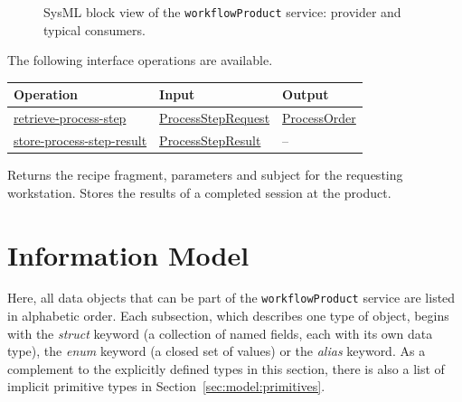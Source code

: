 \documentclass[a4paper]{arrowhead}
\newcommand{\mref}[1]{{\textcolor{ArrowheadPurple}{\hyperref[sec:model:#1]{#1}}}}
\newcommand{\oref}[1]{{\textcolor{ArrowheadBlue}{\hyperref[sec:operations:#1]{#1}}}}
\begin{document}
\begin{figure}[ht!]
  \centering
  \caption{SysML block view of the \texttt{workflowProduct} service: provider and typical consumers.}
  \label{fig:SD}
\end{figure}

The following interface operations are available.

{\small
\begin{longtable}{|p{4.4cm}|p{5.6cm}|p{5.8cm}|}

\hline
\rowcolor{gray!33} Operation & Input & Output \\ \hline
\endhead
\oref{retrieve-process-step} & \mref{ProcessStepRequest} & \mref{ProcessOrder} \\ \hline
\oref{store-process-step-result} & \mref{ProcessStepResult} & -- \\ \hline
\end{longtable}
}

Returns the recipe fragment, parameters and subject for the requesting workstation.
Stores the results of a completed session at the product.

\newpage
\section{Information Model}
\label{sec:model}
Here, all data objects that can be part of the \texttt{workflow\allowbreak{}Product} service are listed in alphabetic order. Each
subsection, which describes one type of object, begins with the \textit{struct} keyword (a collection of named fields,
each with its own data type), the \textit{enum} keyword (a closed set of values) or the \textit{alias} keyword. As a
complement to the explicitly defined types in this section, there is also a list of implicit primitive types in
Section~\ref{sec:model:primitives}.
\end{document}
